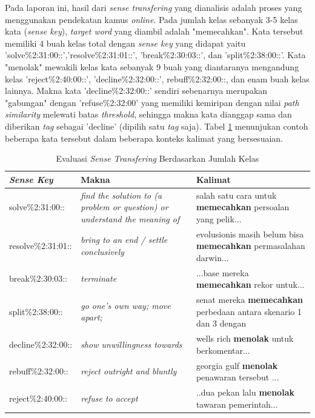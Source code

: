 Pada laporan ini, hasil dari \textit{sense transfering} yang dianalisis adalah proses yang menggunakan pendekatan kamus \textit{online}. Pada jumlah kelas sebanyak 3-5 kelas kata (\textit{sense key}), \textit{target word} yang diambil adalah "memecahkan". Kata tersebut memiliki 4 buah kelas total dengan \textit{sense key} yang didapat yaitu 'solve\%2:31:00::','resolve\%2:31:01::', 'break\%2:30:03::', dan 'split\%2:38:00::'. Kata "menolak" mewakili kelas kata sebanyak 9 buah yang diantaranya mengandung kelas 'reject\%2:40:00::', 'decline\%2:32:00::', rebuff\%2:32:00::, dan enam buah kelas lainnya. Makna kata 'decline\%2:32:00::' sendiri sebenarnya merupakan "gabungan" dengan 'refuse\%2:32:00' yang memiliki kemiripan dengan nilai \textit{path similarity} melewati batas \textit{threshold}, sehingga makna kata dianggap sama dan diberikan \textit{tag} sebagai 'decline' (dipilih satu \textit{tag} saja). Tabel \ref{table:number-classes-sense-transfering-evaluation} menunjukan contoh beberapa kata tersebut dalam beberapa konteks kalimat yang bersesuaian.

\begin{table}
	\centering
	\caption{Evaluasi \textit{Sense Transfering} Berdasarkan Jumlah Kelas}
	\label{table:number-classes-sense-transfering-evaluation}
	\begin{tabular}{|p{4cm}|p{4cm}|p{4cm}|}
		\hline
		\textbf{\textit{Sense Key}} & \textbf{Makna} & \textbf{Kalimat}
		\\ \hline
		solve\%2:31:00::  & 
		\textit{find the solution to (a problem or question) or understand the meaning of}   & 
		salah satu cara untuk \textbf{memecahkan} persoalan yang pelik...
		\\ \hline
		resolve\%2:31:01:: & 
		\textit{bring to an end / settle conclusively}   & 
		evolusionis masih belum bisa \textbf{memecahkan} permasalahan darwin...
		\\ \hline
		break\%2:30:03:: & 
		\textit{terminate}   & 
		...base mereka \textbf{memecahkan} rekor untuk...
		\\ \hline
		split\%2:38:00:: &
		\textit{go one's own way; move apart;} &
		senat mereka \textbf{memecahkan} perbedaan antara skenario 1 dan 3 dengan
		\\ \hline
		decline\%2:32:00:: &
		\textit{show unwillingness towards} &
		wells rich \textbf{menolak} untuk berkomentar...
		\\ \hline
		rebuff\%2:32:00:: &
		\textit{reject outright and bluntly} &
		georgia gulf \textbf{menolak} penawaran tersebut ...
		\\ \hline
		reject\%2:40:00:: &
		\textit{refuse to accept} &
		..dua pekan lalu \textbf{menolak} tawaran pemerintah...
		\\ \hline
	\end{tabular}
\end{table}


